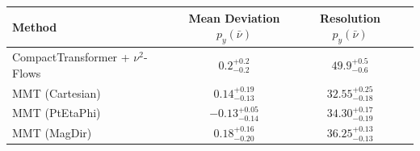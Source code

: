     \begin{tabular}{lccc}
        \toprule
        Method & Mean Deviation $p_{y}(\bar{\nu})$ & Resolution $p_{y}(\bar{\nu})$ \\
        \midrule
        CompactTransformer + $\nu^2$-Flows & $0.2^{+0.2}_{-0.2}$ & $49.9^{+0.5}_{-0.6}$ \\
        MMT (Cartesian) & $0.14^{+0.19}_{-0.13}$ & $32.55^{+0.25}_{-0.18}$ \\
        MMT (PtEtaPhi) & $-0.13^{+0.05}_{-0.14}$ & $34.30^{+0.17}_{-0.19}$ \\
        MMT (MagDir) & $0.18^{+0.16}_{-0.20}$ & $36.25^{+0.13}_{-0.13}$ \\
        \bottomrule
    \end{tabular}